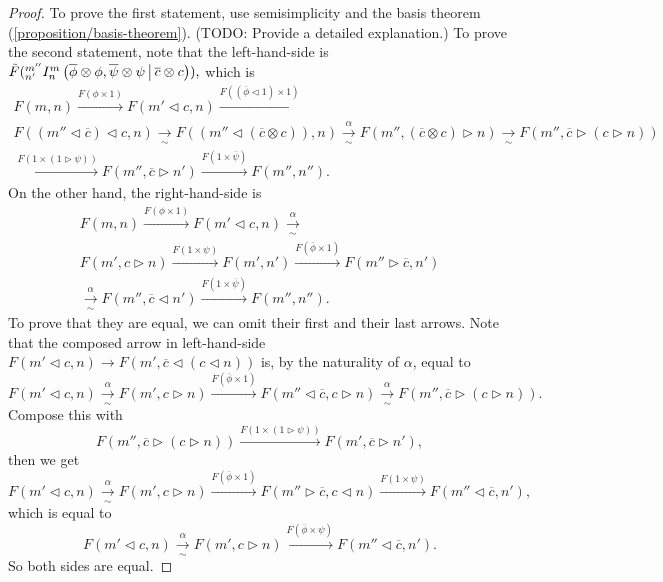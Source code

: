 \begin{proof}
  To prove the first statement, use semisimplicity and the basis theorem
  (\ref{proposition/basis-theorem}). (TODO: Provide a detailed explanation.)
  To prove the second statement, note that the left-hand-side is
  $\tilde{F}({}^{m''}_{n'} I^{m}_{n} \left( \overline{\phi} \otimes \phi, \overline{\psi} \otimes \psi \,\middle|\, \overline{c} \otimes c \right)),$ which is
  \begin{multline*}
    F(m,n)
    \xrightarrow{F(\phi \times 1)}
    F(m' \lhd c, n)
    \xrightarrow{F((\overline{\phi} \lhd 1) \times 1)} \\
    F((m'' \lhd \overline{c}) \lhd c, n)
    \xrightarrow[\sim]{}
    F((m'' \lhd (\overline{c} \otimes c)), n)
    \xrightarrow[\sim]{\alpha}
    F(m'', (\overline{c} \otimes c) \rhd n)
    \xrightarrow[\sim]{}
    F(m'', \overline{c} \rhd (c \rhd n)) \\
    \xrightarrow{F(1 \times (1 \rhd \psi))}
    F(m'', \overline{c} \rhd n')
    \xrightarrow{F(1 \times \overline{\psi})}
    F(m'',n'').
  \end{multline*}
  On the other hand, the right-hand-side is
  \begin{multline*}
    F(m,n)
    \xrightarrow{F(\phi \times 1)}
    F(m' \lhd c, n)
    \xrightarrow[\sim]{\alpha} \\
    F(m', c \rhd n)
    \xrightarrow{F(1 \times \psi)}
    F(m', n')
    \xrightarrow{F(\overline{\phi} \times 1)}
    F(m'' \rhd \overline{c}, n') \\
    \xrightarrow[\sim]{\alpha}
    F(m'', \overline{c} \lhd n')
    \xrightarrow{F(1 \times \overline{\psi})}
    F(m'',n'').
  \end{multline*}
  To prove that they are equal, we can omit their first and their last arrows. Note that the composed arrow in left-hand-side $F(m' \lhd c, n) \to F(m', \overline{c} \lhd (c \lhd n))$ is, by the naturality of $\alpha$, equal to
  \[
    F(m' \lhd c, n)
    \xrightarrow[\sim]{\alpha}
    F(m', c \rhd n)
    \xrightarrow{F(\overline{\phi} \times 1)}
    F(m'' \lhd \overline{c}, c \rhd n)
    \xrightarrow[\sim]{\alpha}
    F(m'', \overline{c} \rhd (c \rhd n)).
  \]
  Compose this with
  \[
    F(m'', \overline{c} \rhd (c \rhd n))
    \xrightarrow{F(1 \times (1 \rhd \psi))}
    F(m', \overline{c} \rhd n'),
  \]
  then we get
  \[
    F(m' \lhd c, n)
    \xrightarrow[\sim]{\alpha}
    F(m', c \rhd n)
    \xrightarrow{F(\overline{\phi} \times 1)}
    F(m'' \rhd \overline{c}, c \lhd n)
    \xrightarrow{F(1 \times \psi)}
    F(m'' \lhd \overline{c}, n'),
  \]
  which is equal to
  \[
    F(m' \lhd c, n)
    \xrightarrow[\sim]{\alpha}
    F(m', c \rhd n)
    \xrightarrow{F(\overline{\phi} \times \psi)}
    F(m'' \lhd \overline{c}, n').
  \]
  So both sides are equal.
\end{proof}

